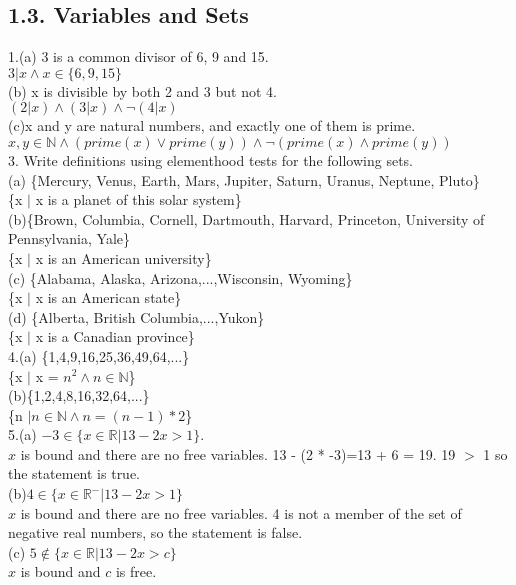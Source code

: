 \documentclass{article}
\begin{document}
 \subsection*{1.3. Variables and Sets}
 1.(a) 3 is a common divisor of 6, 9 and 15.\\
 $3 | x \wedge x \in \{6,9,15 \}$\\
 (b) x is divisible by both 2 and 3 but not 4.\\
 $(2 | x) \wedge (3 | x) \wedge \neg (4 | x)$\\
 (c)x and y are natural numbers, and exactly one of them is prime.\\
 $x, y \in \mathbb{N} \wedge (prime(x) \vee prime(y)) \wedge \neg (prime(x) \wedge prime(y)) $\\
 3. Write definitions using elementhood tests for the following sets.\\
 (a) \{Mercury, Venus, Earth, Mars, Jupiter, Saturn, Uranus, Neptune, Pluto\}\\
 \{x $|$ x is a planet of this solar system\}\\
 (b)\{Brown, Columbia, Cornell, Dartmouth, Harvard, Princeton, University of Pennsylvania, Yale\}\\
 \{x $|$ x is an American university\}\\
 (c) \{Alabama, Alaska, Arizona,...,Wisconsin, Wyoming\}\\
 \{x $|$ x is an American state\}\\
 (d) \{Alberta, British Columbia,...,Yukon\}\\
 \{x $|$ x is a Canadian province\}\\
4.(a) \{1,4,9,16,25,36,49,64,...\}\\
\{x $|$ x = $n^2 \wedge n \in \mathbb{N}$\}\\
(b)\{1,2,4,8,16,32,64,...\}\\
\{n $| n \in \mathbb{N} \wedge n = (n-1)*2$\}\\
5.(a) $-3 \in \{x \in \mathbb{R} | 13 - 2x > 1\}$.\\
$x$ is bound and there are no free variables. 13 - (2 * -3)=13 + 6 = 19. 19 $>$ 1 so the statement is true.\\
(b)$4 \in \{x \in \mathbb{R^-} | 13 - 2x > 1 \}$\\
$x$ is bound and there are no free variables. 4 is not a member of the set of negative real numbers, so the statement is false.\\
(c) $5 \not \in \{x \in \mathbb{R} | 13 -2x > c\}$\\
$x$ is bound and $c$ is free.\\
\end{document}
